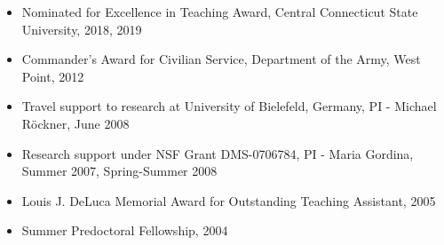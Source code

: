 \documentclass[letterpaper]{article}
\begin{document}
{{{{{{{{{{{{{{\begin{itemize}
\item Nominated for Excellence in Teaching Award, Central Connecticut State University, 2018, 2019
\item Commander's Award for Civilian Service, Department of the Army, West Point, 2012
\item Travel support to research at University of Bielefeld, Germany, PI - Michael R\"ockner, June 2008
\item Research support under NSF Grant DMS-0706784, PI - Maria Gordina, Summer 2007, Spring-Summer 2008
\item Louis J. DeLuca Memorial Award for Outstanding Teaching Assistant, 2005
\item Summer Predoctoral Fellowship, 2004
\end{itemize}

\begin{comment}
\vskip 1em
\noindent {\textcolor{mycol}{{\bf\large Talks/Presentations}}\vskip -1em
\noindent {\textcolor{mycol}{\underline{\hspace{6.5in}}}

\begin{itemize}
\item {\it Parameter Estimation and the German Tank Problem}, September 2018, Central Connecticut State University
\item {\it Martingales for fun and (non)-profit}, April 2018, Central Connecticut State University
\item {\it Introduction to Pricing Financial Options}, Ohio Speaker Circuit, April 2015, Ohio Wesleyan University
\item {\it Introduction to Black-Scholes options pricing}, Ohio Speaker Circuit, April 2014, Oberlin College
\item{\it Numerical Methods for Stochastic Differential Equations}, Joint Mathematics Meeting, January 2012, Boston, MA.\vskip 1ex
\item{\it The Touchy-Feely Integral}, Joint Mathematics Meeting, January 2012,  Boston, MA.\vskip 1ex
\item \emph{Brownian motion: Its history and properties}, Seminar, April 2011, Central Connecticut State University, CT
\item{\it Brownian motion II: Applications and introduction to stochastic calculus}, Research seminar, November 2010, West Point, NY
\item{\it Brownian motion I: History, L\'evy's $L^{2} $-construction, and properties}, Research seminar, November 2010, West Point, NY
\item{\it Evolution Systems of Measures for Non-autonomous Ornstein-Uhlenbeck Processes with L\'evy Noise}, Joint Mathematics Meeting, January 2009, Washington DC.\vskip 1ex
\item{\it Invariant Measures for Ornstein-Uhlenbeck Processes with L\'evy Noise}, Northeast Probability Seminar, November 2008, NYC, NY
\end{itemize}
\end{comment}

}}}}}}}}}}}}}}
\end{document}
